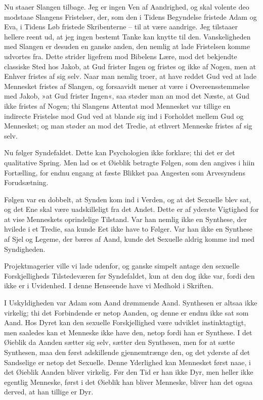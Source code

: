 \documentclass[12pt,a4paper]{article}
\begin{document}
Nu staaer Slangen tilbage. Jeg er ingen Ven af Aandrighed, og skal volente deo modstaae Slangens Fristelser, der, som den i Tidens Begyndelse fristede Adam og Eva, i Tidens Løb fristede Skribenterne – til at være aandrige. Jeg tilstaaer hellere reent ud, at jeg ingen bestemt Tanke kan knytte til den. Vanskeligheden med Slangen er desuden en ganske anden, den nemlig at lade Fristelsen komme udvortes fra. Dette strider ligefrem mod Bibelens Lære, mod det bekjendte classiske Sted hos Jakob, at Gud frister Ingen og fristes og ikke af Nogen, men at Enhver fristes af sig selv. Naar man nemlig troer, at have reddet Gud ved at lade Mennesket fristes af Slangen, og forsaavidt mener at være i Overeensstemmelse med Jakob, »at Gud frister Ingen«, saa støder man an mod det Næste, at Gud ikke fristes af Nogen; thi Slangens Attentat mod Mennesket var tillige en indirecte Fristelse mod Gud ved at blande sig ind i Forholdet mellem Gud og Mennesket; og man støder an mod det Tredie, at ethvert Menneske fristes af sig selv.

Nu følger Syndefaldet. Dette kan Psychologien ikke forklare; thi det er det qualitative Spring. Men lad os et Øieblik betragte Følgen, som den angives i hiin Fortælling, for endnu engang at fæste Blikket paa Angesten som Arvesyndens Forudsætning.

Følgen var en dobbelt, at Synden kom ind i Verden, og at det Sexuelle blev sat, og det Ene skal være uadskilleligt fra det Andet. Dette er af yderste Vigtighed for at vise Menneskets oprindelige Tilstand. Var han nemlig ikke en Synthese, der hvilede i et Tredie, saa kunde Eet ikke have to Følger. Var han ikke en Synthese af Sjel og Legeme, der bæres af Aand, kunde det Sexuelle aldrig komme ind med Syndigheden.

Projektmagerier ville vi lade udenfor, og ganske simpelt antage den sexuelle Forskjelligheds Tilstedeværen før Syndefaldet, kun at den dog ikke var, fordi den ikke er i Uvidenhed. I denne Henseende have vi Medhold i Skriften.

I Uskyldigheden var Adam som Aand drømmende Aand. Synthesen er altsaa ikke virkelig; thi det Forbindende er netop Aanden, og denne er endnu ikke sat som Aand. Hos Dyret kan den sexuelle Forskjellighed være udviklet instinktagtigt, men saaledes kan et Menneske ikke have den, netop fordi han er Synthese. I det Øieblik da Aanden sætter sig selv, sætter den Synthesen, men for at sætte Synthesen, maa den først adskillende gjennemtrænge den, og det yderste af det Sandselige er netop det Sexuelle. Denne Yderlighed kan Mennesket først naae, i det Øieblik Aanden bliver virkelig. Før den Tid er han ikke Dyr, men heller ikke egentlig Menneske, først i det Øieblik han bliver Menneske, bliver han det ogsaa derved, at han tillige er Dyr.
\end{document}
